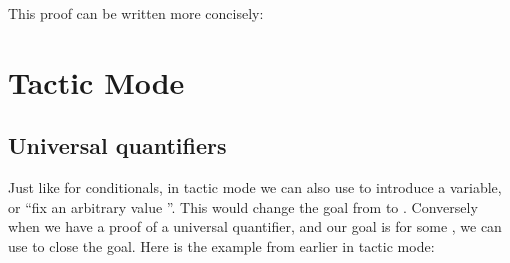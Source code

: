 \documentclass[letterpaper,10pt,english]{sphinxmanual}
\begin{document}
\sphinxAtStartPar
This proof can be written more concisely:

\begin{sphinxVerbatim}[commandchars=\\\{\}]
             
       
\end{sphinxVerbatim}


\section{Tactic Mode}
\label{\detokenize{first_order_logic_in_lean:tactic-mode}}

\subsection{Universal quantifiers}
\label{\detokenize{first_order_logic_in_lean:universal-quantifiers}}
\sphinxAtStartPar
Just like for conditionals,
in tactic mode we can also use  to introduce a variable,
or “fix an arbitrary value ”.
This would change the goal from  to .
Conversely when we have a proof  of a universal quantifier,
and our goal is  for some ,
we can use  to close the goal.
Here is the example from earlier in tactic mode:

\begin{sphinxVerbatim}[commandchars=\\\{\}]
                      
   
             
    
   
    
   
\end{sphinxVerbatim}
\end{document}
